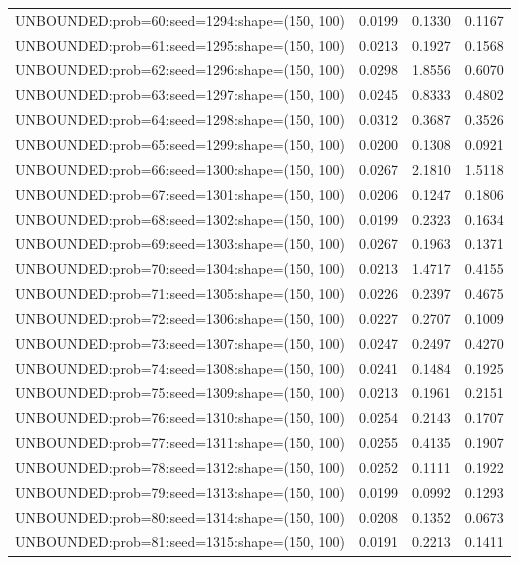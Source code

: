 \begin{longtable}{lccc}
UNBOUNDED:prob=60:seed=1294:shape=(150, 100)  &   0.0199 &  0.1330 &  0.1167 \\
UNBOUNDED:prob=61:seed=1295:shape=(150, 100)  &   0.0213 &  0.1927 &  0.1568 \\
UNBOUNDED:prob=62:seed=1296:shape=(150, 100)  &   0.0298 &  1.8556 &  0.6070 \\
UNBOUNDED:prob=63:seed=1297:shape=(150, 100)  &   0.0245 &  0.8333 &  0.4802 \\
UNBOUNDED:prob=64:seed=1298:shape=(150, 100)  &   0.0312 &  0.3687 &  0.3526 \\
UNBOUNDED:prob=65:seed=1299:shape=(150, 100)  &   0.0200 &  0.1308 &  0.0921 \\
UNBOUNDED:prob=66:seed=1300:shape=(150, 100)  &   0.0267 &  2.1810 &  1.5118 \\
UNBOUNDED:prob=67:seed=1301:shape=(150, 100)  &   0.0206 &  0.1247 &  0.1806 \\
UNBOUNDED:prob=68:seed=1302:shape=(150, 100)  &   0.0199 &  0.2323 &  0.1634 \\
UNBOUNDED:prob=69:seed=1303:shape=(150, 100)  &   0.0267 &  0.1963 &  0.1371 \\
UNBOUNDED:prob=70:seed=1304:shape=(150, 100)  &   0.0213 &  1.4717 &  0.4155 \\
UNBOUNDED:prob=71:seed=1305:shape=(150, 100)  &   0.0226 &  0.2397 &  0.4675 \\
UNBOUNDED:prob=72:seed=1306:shape=(150, 100)  &   0.0227 &  0.2707 &  0.1009 \\
UNBOUNDED:prob=73:seed=1307:shape=(150, 100)  &   0.0247 &  0.2497 &  0.4270 \\
UNBOUNDED:prob=74:seed=1308:shape=(150, 100)  &   0.0241 &  0.1484 &  0.1925 \\
UNBOUNDED:prob=75:seed=1309:shape=(150, 100)  &   0.0213 &  0.1961 &  0.2151 \\
UNBOUNDED:prob=76:seed=1310:shape=(150, 100)  &   0.0254 &  0.2143 &  0.1707 \\
UNBOUNDED:prob=77:seed=1311:shape=(150, 100)  &   0.0255 &  0.4135 &  0.1907 \\
UNBOUNDED:prob=78:seed=1312:shape=(150, 100)  &   0.0252 &  0.1111 &  0.1922 \\
UNBOUNDED:prob=79:seed=1313:shape=(150, 100)  &   0.0199 &  0.0992 &  0.1293 \\
UNBOUNDED:prob=80:seed=1314:shape=(150, 100)  &   0.0208 &  0.1352 &  0.0673 \\
UNBOUNDED:prob=81:seed=1315:shape=(150, 100)  &   0.0191 &  0.2213 &  0.1411 \\

\end{longtable}
